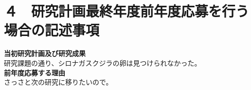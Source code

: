 
\section{４　研究計画最終年度前年度応募を行う場合の記述事項}

\newcommand{\最終年度研究種目名}{基盤研究（Z）}
\newcommand{\最終年度研究課題番号}{99999}
\newcommand{\最終年度研究課題名}{シロナガスクジラの卵はなぜ見つけられないのか}
\newcommand{\最終年度研究期間}{平成25年度〜令和\一年目 年度}


\noindent
\textbf{当初研究計画及び研究成果}\\
	研究課題の通り、シロナガスクジラの卵は見つけられなかった。
\\

\noindent
\textbf{前年度応募する理由}\\
	さっさと次の研究に移りたいので。



